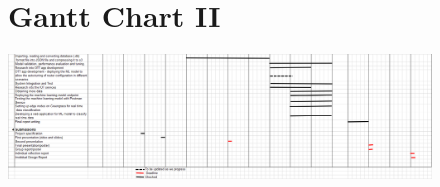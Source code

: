 \begin{landscape}
\begin{figure}[ht]
\begin{minipage}{\linewidth}
\section{Gantt Chart II}

   \centering
    \includegraphics[width=1\linewidth]{images/Gantt2.PNG} 
    \label{appendix:Gantt}

\end{minipage}
\end{figure}
    \end{landscape}
    




